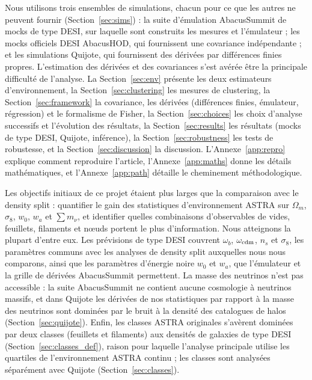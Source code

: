 \documentclass[11pt,twocolumn]{article}
\begin{document}
Nous utilisons trois ensembles de simulations, chacun pour ce que les autres ne peuvent fournir (Section~\ref{sec:sims}) : la suite d'émulation AbacusSummit de mocks de type DESI, sur laquelle sont construits les mesures et l'émulateur ; les mocks officiels DESI AbacusHOD, qui fournissent une covariance indépendante ; et les simulations Quijote, qui fournissent des dérivées par différences finies propres. L'estimation des dérivées et des covariances s'est avérée être la principale difficulté de l'analyse. La Section~\ref{sec:env} présente les deux estimateurs d'environnement, la Section~\ref{sec:clustering} les mesures de clustering, la Section~\ref{sec:framework} la covariance, les dérivées (différences finies, émulateur, régression) et le formalisme de Fisher, la Section~\ref{sec:choices} les choix d'analyse successifs et l'évolution des résultats, la Section~\ref{sec:results} les résultats (mocks de type DESI, Quijote, inférence), la Section~\ref{sec:robustness} les tests de robustesse, et la Section~\ref{sec:discussion} la discussion. L'Annexe~\ref{app:repro} explique comment reproduire l'article, l'Annexe~\ref{app:maths} donne les détails mathématiques, et l'Annexe~\ref{app:path} détaille le cheminement méthodologique.

Les objectifs initiaux de ce projet étaient plus larges que la comparaison avec le density split : quantifier le gain des statistiques d'environnement ASTRA sur $\Omega_m$, $\sigma_8$, $w_0$, $w_a$ et $\sum m_\nu$, et identifier quelles combinaisons d'observables de vides, feuillets, filaments et nœuds portent le plus d'information. Nous atteignons la plupart d'entre eux. Les prévisions de type DESI couvrent $\omega_b$, $\omega_{\rm cdm}$, $n_s$ et $\sigma_8$, les paramètres communs avec les analyses de density split auxquelles nous nous comparons, ainsi que les paramètres d'énergie noire $w_0$ et $w_a$, que l'émulateur et la grille de dérivées AbacusSummit permettent. La masse des neutrinos n'est pas accessible : la suite AbacusSummit ne contient aucune cosmologie à neutrinos massifs, et dans Quijote les dérivées de nos statistiques par rapport à la masse des neutrinos sont dominées par le bruit à la densité des catalogues de halos (Section~\ref{sec:quijote}). Enfin, les classes ASTRA originales s'avèrent dominées par deux classes (feuillets et filaments) aux densités de galaxies de type DESI (Section~\ref{sec:classes_def}), raison pour laquelle l'analyse principale utilise les quartiles de l'environnement ASTRA continu ; les classes sont analysées séparément avec Quijote (Section~\ref{sec:classes}).
\end{document}

